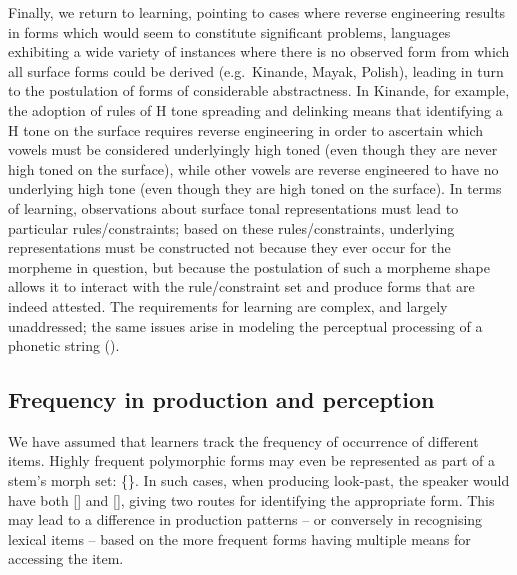 Finally, we return to learning, pointing to cases where reverse engineering results in forms which would seem to constitute significant problems, languages exhibiting a wide variety of instances where there is no observed form from which all surface forms could be derived (e.g.\ Kinande, Mayak, Polish), leading in turn to the postulation of forms of considerable abstractness.  In Kinande, for example, the adoption of rules of H tone spreading and delinking means that identifying a H tone on the surface requires  reverse engineering in order to ascertain which vowels must be considered underlyingly high toned (even though they are never high toned on the surface), while other vowels  are reverse engineered to have no underlying high tone (even though they are high toned on the surface).  In terms of learning, observations about surface tonal representations must lead to particular rules/constraints; based on these rules/constraints, underlying representations must be constructed not because they ever occur for the morpheme in question, but because the postulation of such a morpheme shape allows it to interact with the rule/constraint set and produce forms that are indeed attested. The requirements for learning are complex, and largely unaddressed; the same issues arise in modeling the perceptual processing of a phonetic string (\citealt{Boersma:2011}).


\subsection{Frequency in production and perception}

We have assumed that learners track the frequency of occurrence of different items. Highly frequent polymorphic forms may even be represented as part of a stem's morph set: \{\}. In such cases, when producing {\sc look-past}, the speaker would have both [] and [], giving two routes for identifying the appropriate form. This may lead to a difference in production patterns -- or conversely in  recognising lexical items -- based on the more frequent forms having multiple means for accessing the item.



